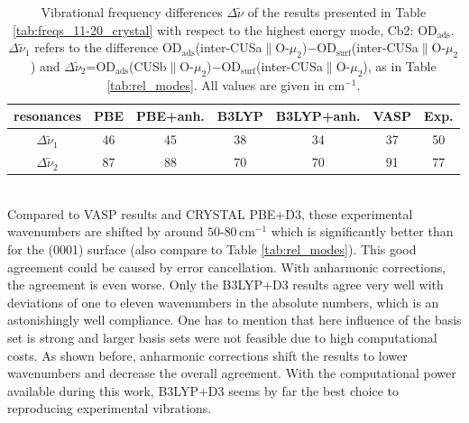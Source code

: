\documentclass[11pt,DIV=13,BCOR=5mm,a4paper,headinclude]{scrbook}
\begin{document}
\begin{table}[!h]
  \centering
  \caption{Vibrational frequency differences $\Delta \tilde{\nu}$ of the results presented in Table \ref{tab:freqs_11-20_crystal} with respect to the highest energy mode, Cb2: OD$_\textrm{ads}$.
  $\Delta \tilde{\nu}_1$ refers to the difference OD$_\textrm{ads}$(inter-CUSa$\parallel$O-$\mu_2$)$-$OD$_\textrm{surf}$(inter-CUSa$\parallel$O-$\mu_2$) and $\Delta \tilde{\nu}_2$=OD$_\textrm{ads}$(CUSb$\parallel$O-$\mu_2$)$-$OD$_\textrm{surf}$(inter-CUSa$\parallel$O-$\mu_2$), as in Table \ref{tab:rel_modes}.
All values are given in cm$^{-1}$.}
  \begin{tabular}{c|cc|cc|c|c}
  \toprule
   resonances& PBE & PBE+anh. & B3LYP & B3LYP+anh. &VASP&Exp.\\\midrule
$\Delta \tilde{\nu}_1$ & 46 & 45 & 38 & 34 & 37 & 50\\
$\Delta \tilde{\nu}_2$  & 87 & 88 & 70 & 70 & 91 & 77\\\bottomrule
    \end{tabular}
  \label{tab:freqs_11-20_crystal-relative}
\end{table}
\\
Compared to VASP results and CRYSTAL PBE+D3, these experimental wavenumbers are shifted by around $50$-$80\,$cm$^{-1}$ which is significantly better than for the (0001) surface (also compare to Table \ref{tab:rel_modes}).
This good agreement could be caused by error cancellation.
With anharmonic corrections, the agreement is even worse.
Only the B3LYP+D3 results agree very well with deviations of one to eleven wavenumbers in the absolute numbers, which is an astonishingly well compliance.
One has to mention that here influence of the basis set is strong and larger basis sets were not feasible due to high computational costs.
As shown before, anharmonic corrections shift the results to lower wavenumbers and decrease the overall agreement.
With the computational power available during this work, B3LYP+D3 seems by far the best choice to reproducing experimental vibrations.
\end{document}
